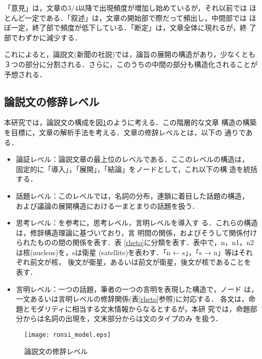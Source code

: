 「意見」は，文章の$3/4$以降で出現頻度が増加し始めているが，それ以前では
ほとんど一定である．「叙述」は，文章の開始部で際だって頻出し，中間部では
ほぼ一定，終了部で頻度が低下している．「断定」は，文章全体に現れるが，終
了部でわずかに減少する．

これによると，論説文(新聞の社説)では，論旨の展開の構造があり，少なくとも
３つの部分に分割される．さらに，このうちの中間の部分も構造化されることが
予想される．


\subsection{論説文の修辞レベル}

本研究では，論説文の構成を図\ref{model}のように考える．この階層的な文章
構造の構築を目標に，文章の解析手法を考える．文章の修辞レベルとは，以下の
通りである．
\begin{itemize}

 \item 論証レベル：論説文章の最上位のレベルである．ここのレベルの構造は，
       固定的に「導入」，「展開」，「結論」をノードとして，これ以下の構
       造を統括する．

 \item 話題レベル：このレベルでは，名詞の分布，連鎖に着目した話題の構造，
       および議論の展開構造における一まとまりの話題を扱う．

\item 思考レベル：\hspace{2mm}\cite{Ono:89}\hspace{2mm}を参考に，思考レベル，言明レベルを導入す
      る．これらの構造は，修辞構造理論\cite{Mann:87:a}に基づいており，言
      明間の関係，およびそうして関係付けられたものの間の関係を表す．表
      \ref{rheto}に分類を表す．表中で，n，n1，n2は核(nucleus)を，sは衛星
      (satellite)を表わす．「n ← s」，「s → n」等はそれぞれ前文が核，
      後文が衛星，あるいは前文が衛星，後文が核であることを表す．

 \item 言明レベル：一つの話題，筆者の一つの言明を表現した構造で，ノード
       は，一文あるいは言明レベルの修辞関係(表\ref{rheto}参照)に対応する．
       各文は，命題とモダリティに相当する文末情報からなるとするが，本研
       究では，命題部分からは名詞の出現を，文末部分からは文のタイプのみ
       を扱う．

\end{itemize}
\begin{figure}[htbp]
\begin{center}
\texttt{[image: ronsi\_model.eps]}
\caption{論説文の修辞レベル}\label{model}
\end{center}
\end{figure}

